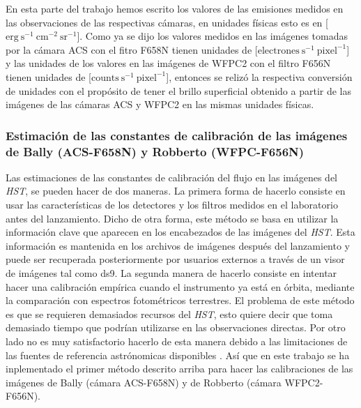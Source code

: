 \label{sec:const}
En esta parte del trabajo hemos escrito los valores de las emisiones medidos en las observaciones de las respectivas cámaras, en unidades físicas esto es en [\(\mathrm{erg\ s^{-1}\ cm^{-2}\ sr^{-1}}\)]. Como ya se dijo los valores medidos en las imágenes tomadas por la cámara ACS con el fitro F658N tienen unidades de [\(\mathrm{electrones\ s^{-1}}~\text{pixel}^{-1}\)] y las unidades de los valores en las imágenes de WFPC2 con el filtro F656N tienen unidades de [\(\text{counts}\ \text{s}^{-1}~\text{pixel}^{-1}\)], entonces se relizó la respectiva conversión de unidades con el propósito de tener el brillo superficial obtenido a partir de las imágenes de las cámaras ACS y WFPC2 en las mismas unidades físicas.\\

\subsubsection{Estimación de las constantes de calibración de las imágenes de Bally (ACS-F658N) y Robberto (WFPC-F656N)}
\label{sec:acs}

Las estimaciones de las constantes de calibración del flujo en las imágenes del \textit{HST}, se pueden hacer de dos maneras. La primera forma de hacerlo consiste en usar las características de los detectores y los filtros medidos en el laboratorio antes del lanzamiento. Dicho de otra forma, este método se basa en utilizar la información clave que aparecen en los encabezados de las imágenes del \textit{HST}. Esta información es mantenida en los archivos de imágenes después del lanzamiento y puede ser recuperada posteriormente por usuarios externos  a través de un visor de imágenes tal como ds9. La segunda manera de hacerlo consiste en intentar hacer una calibración empírica cuando el instrumento ya está en órbita, mediante la comparación con espectros fotométricos terrestres. El problema de este método es que se requieren demasiados recursos del \textit{HST}, esto quiere decir que toma demasiado tiempo que podrían utilizarse en las observaciones directas. Por otro lado no es muy satisfactorio hacerlo de esta manera debido a las limitaciones de las fuentes de referencia astrónomicas disponibles \citep{McMaster:2008}. Así que en este trabajo se ha inplementado el primer método descrito arriba para hacer las calibraciones de las imágenes de Bally (cámara ACS-F658N) y de Robberto (cámara WFPC2-F656N).\\     

